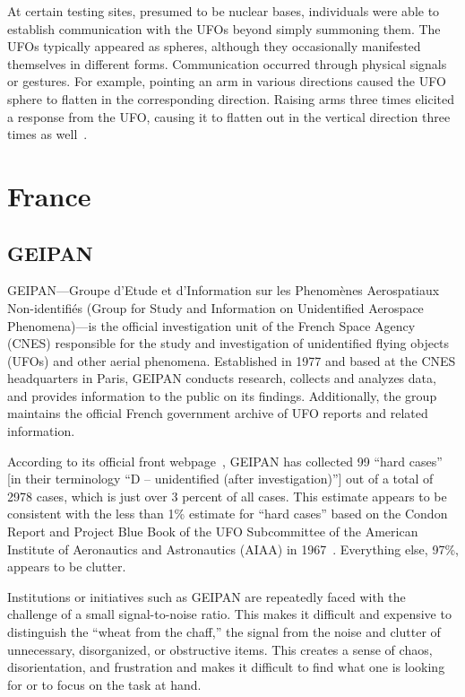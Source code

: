 At certain testing sites, presumed to be nuclear bases, individuals were able to establish communication with the UFOs beyond simply summoning them. The UFOs typically appeared as spheres, although they occasionally manifested themselves in different forms. Communication occurred through physical signals or gestures. For example, pointing an arm in various directions caused the UFO sphere to flatten in the corresponding direction. Raising arms three times elicited a response from the UFO, causing it to flatten out in the vertical direction three times as well~\cite{Hesemann2000,Uvarov_2000}.

\section{France}
\label{2023-UFO-part-Perception-types-France}

\subsection{GEIPAN}

GEIPAN---Groupe d'Etude et d'Information sur les Phenom\`enes Aerospatiaux Non-identifi\'es
(Group for Study and Information on Unidentified Aerospace Phenomena)---is the official investigation unit of the
French Space Agency (CNES) responsible for the study and investigation of unidentified flying objects (UFOs) and other aerial phenomena. Established in 1977 and based at the CNES headquarters in Paris, GEIPAN conducts research, collects and analyzes data, and provides information to the public on its findings. Additionally, the group maintains the official French government archive of UFO reports and related information.

According to its official front webpage~\cite{Geipan}, GEIPAN has collected 99 ``hard cases'' [in their terminology ``D --
unidentified (after investigation)''] out of a total of 2978 cases, which is just over 3 percent of all cases.
This estimate appears to be consistent with the less than 1{\%}
estimate for ``hard cases'' based on the Condon Report and Project Blue Book of the UFO
Subcommittee of the American Institute of Aeronautics and Astronautics (AIAA) in 1967~\cite{AA-Condon-1970}. Everything else, 97{\%}, appears to be clutter.

Institutions or initiatives such as GEIPAN are repeatedly faced with the challenge of a small signal-to-noise ratio. This makes it difficult and expensive to distinguish the ``wheat from the chaff,'' the signal from the noise and clutter of unnecessary, disorganized, or obstructive items. This creates a sense of chaos, disorientation, and frustration and makes it difficult to find what one is looking for or to focus on the task at hand.

